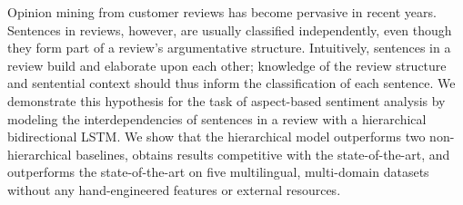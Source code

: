 Opinion mining from customer reviews has become pervasive in recent years. Sentences in reviews, however, are usually classified independently, even though they form part of a review's argumentative structure. Intuitively, sentences in a review build and elaborate upon each other; knowledge of the review structure and sentential context should thus inform the classification of each sentence. We demonstrate this hypothesis for the task of aspect-based sentiment analysis by modeling the interdependencies of sentences in a review with a hierarchical bidirectional LSTM. We show that the hierarchical model outperforms two non-hierarchical baselines, obtains results competitive with the state-of-the-art, and outperforms the state-of-the-art on five multilingual, multi-domain datasets without any hand-engineered features or external resources.
